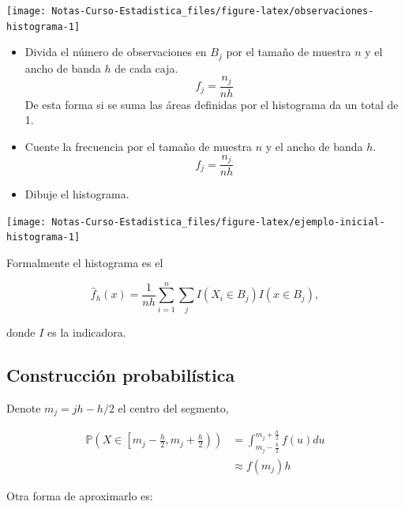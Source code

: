 \documentclass[
  12pt,
]{book}
\begin{document}
\begin{center}\texttt{[image: Notas-Curso-Estadistica\_files/figure-latex/observaciones-histograma-1]} \end{center}

\begin{itemize}
\item
  Divida el número de observaciones en \(B_j\) por el tamaño de muestra
  \(n\) y el ancho de banda \(h\) de cada caja. \begin{equation*}
  f_j = \frac{n_j}{nh}
  \end{equation*} De esta forma si se suma las áreas definidas por el
  histograma da un total de 1.
\item
  Cuente la frecuencia por el tamaño de muestra \(n\) y el ancho de
  banda \(h\). \begin{equation*}
    f_j = \frac{n_j}{nh}
    \end{equation*}
\item
  Dibuje el histograma.
\end{itemize}

\begin{center}\texttt{[image: Notas-Curso-Estadistica\_files/figure-latex/ejemplo-inicial-histograma-1]} \end{center}

Formalmente el histograma es el

\begin{equation*}
\hat{f}_h(x) = \frac{1}{nh} \sum_{i = 1}^{n} \sum_{j} I(X_i\in B_j) I(x\in B_j),
\end{equation*}

donde \(I\) es la indicadora.

\hypertarget{construcciuxf3n-probabiluxedstica}{%
\subsection{Construcción
probabilística}\label{construcciuxf3n-probabiluxedstica}}

Denote \(m_j=jh-h/2\) el centro del segmento,

\begin{align*}
    \mathbb{P}\left(X\in \left[m_j - \frac{h}{2},m_j + \frac{h}{2} \right)\right)
      & =
    \int_{m_j - \frac{h}{2}}^{m_j + \frac{h}{2}} f(u)du                                             \\
      & \approx f(m_j)h
\end{align*}

Otra forma de aproximarlo es:
\end{document}
